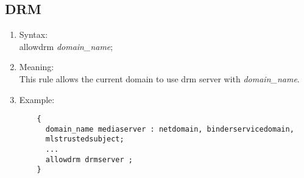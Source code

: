 \documentclass{article}
\begin{document}
\subsection{DRM}
\begin{enumerate}
	\item Syntax:\\
	allowdrm {\em domain\_name};
	\item Meaning:\\
	This rule allows the current domain to use drm server with {\em 
		domain\_name}.
	\item Example:\\
	\begin{verbatim}
	{
	  domain_name mediaserver : netdomain, binderservicedomain, 
	  mlstrustedsubject;
	  ...
	  allowdrm drmserver ;
	}
	\end{verbatim}
\end{enumerate}
\end{document}
